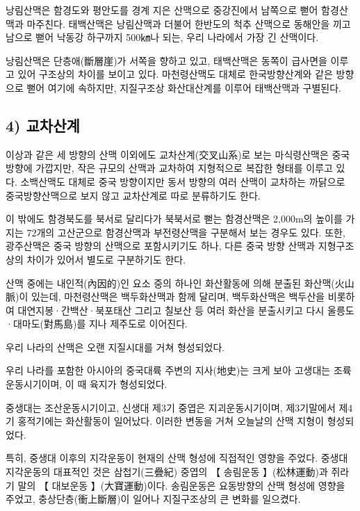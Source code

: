 \documentclass[12pt,a4paper]{book}
\begin{document}
낭림산맥은 함경도와 평안도를 경계 지은 산맥으로 중강진에서 남쪽으로 뻗어 함경산맥과 마주친다. 
태백산맥은 낭림산맥과 더불어 한반도의 척추 산맥으로 동해안을 끼고 남으로 뻗어 낙동강 하구까지 500㎞나 되는, 우리 나라에서 가장 긴 산맥이다.


낭림산맥은 단층애(斷層崖)가 서쪽을 향하고 있고, 태백산맥은 동쪽이 급사면을 이루고 있어 구조상의 차이를 보이고 있다. 마천령산맥도 대체로 한국방향산계와 같은 방향으로 뻗어 여기에 속하지만, 지질구조상 화산대산계를 이루어 태백산맥과 구별된다.


		\newpage  \null
		\subsection{4) 교차산계}
		\null




이상과 같은 세 방향의 산맥 이외에도 교차산계(交叉山系)로 보는 마식령산맥은 중국방향에 가깝지만, 작은 규모의 산맥과 교차하여 지형적으로 복잡한 형태를 이루고 있다. 소백산맥도 대체로 중국 방향이지만 동서 방향의 여러 산맥이 교차하는 까닭으로 중국방향산맥으로 보지 않고 교차산계로 따로 분류하기도 한다.

이 밖에도 함경북도를 북서로 달리다가 북북서로 뻗는 함경산맥은 2,000m의 높이를 가지는 72개의 고산군으로 함경산맥과 부전령산맥을 구분해서 보는 경우도 있다. 또한, 광주산맥은 중국 방향의 산맥으로 포함시키기도 하나, 다른 중국 방향 산맥과 지형구조상의 차이가 있어서 별도로 구분하기도 한다.

산맥 중에는 내인적(內因的)인 요소 중의 하나인 화산활동에 의해 분출된 화산맥(火山脈)이 있는데, 마천령산맥은 백두화산맥과 함께 달리며, 백두화산맥은 백두산을 비롯하여 대연지봉·간백산·북포태산 그리고 칠보산 등 여러 화산을 분출시키고 다시 울릉도·대마도(對馬島)를 지나 제주도로 이어진다.

우리 나라의 산맥은 오랜 지질시대를 거쳐 형성되었다. 

우리 나라를 포함한 아시아의 중국대륙 주변의 지사(地史)는 크게 보아 고생대는 조륙운동시기이며, 이 때 육지가 형성되었다.

중생대는 조산운동시기이고, 신생대 제3기 중엽은 지괴운동시기이며, 제3기말에서 제4기 홍적기에는 화산활동이 일어났다. 이러한 변동을 거쳐 오늘날의 산맥 지형이 형성되었다.

특히, 중생대 이후의 지각운동이 현재의 산맥 형성에 직접적인 영향을 주었다. 중생대 지각운동의 대표적인 것은 삼첩기(三疊紀) 중엽의 【 송림운동 】(松林運動)과 쥐라기 말의 【 대보운동 】(大寶運動)이다. 송림운동은 요동방향의 산맥 형성에 영향을 주었고, 충상단층(衝上斷層)이 일어나 지질구조상의 큰 변화를 일으켰다.
\end{document}
